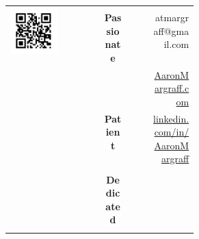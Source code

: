 \documentclass{res}
\begin{document}
\hspace{-1.5cm}\begin{tabular}{lp{0.2\linewidth}cp{0.115\linewidth}r}
\multirow{7}{*}{\includegraphics[scale=0.35]{qr_code.png}}&&&&\\
&&\bf \large Passionate&&\large atmargraff@gmail.com\\
&&&&\href{http://aaronmargraff.com}{\large AaronMargraff.com}\\
&&\bf \large Patient&&\large  \href{https://linkedin.com/in/aaronmargraff}{linkedin.com/in/AaronMargraff}\\
&&&&\\
&&\bf \large Dedicated&&\\
&&&&\\
\end{tabular}
\end{document}
